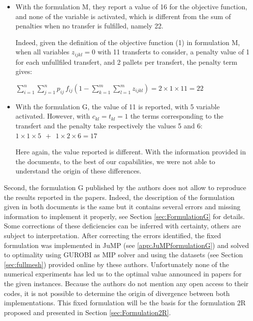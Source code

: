 \documentclass[preprint,12pt,authoryear]{elsarticle}
\begin{document}
 \begin{itemize}
     \item With  the formulation M, they report a value of 16 for the objective function, and none of the variable is activated, which is different from the sum of penalties when no transfer is fulfilled, namely 22.

Indeed, given the definition of the objective function (1) in formulation M, when  all variables $z_{ijkl}=0$  with 11 transferts to consider, a penalty value of 1 for each unfullfiled transfert, and 2 pallets per transfert, the penalty term gives:

$\sum^{n}_{i=1} \sum^{n}_{j=1} p_{ij} \, f_{ij} \left( 1-\sum^{m}_{k=1} \sum^{m}_{l=1} z_{ijkl} \right) = 2 \times 1 \times 11 = 22$

\item With  the formulation G, the value of 11 is reported, with 5 variable activated.
However, with $c_{kl} = t_{kl} = 1 $ the terms corresponding to the transfert and the penalty take respectively the values 5 and 6: \\
$1\times1\times5 \ \ + \ \ 1\times2\times6 = 17$
\vspace{0mm}

Here again, the value reported is different.
With the information provided in the documents, to the best of our capabilities, we were not able to understand the origin of these differences. 
 \end{itemize}


Second, the formulation G published by the authors does not allow to reproduce the results reported in the papers. 
%
Indeed, the description of the formulation given in both documents is the same but it contains several errors and missing information to implement it properly, see Section \ref{sec:FormulationG} for details. Some corrections of these deficiencies can be inferred with certainty, others are subject to interpretation.
%
After correcting the errors identified, the fixed formulation was implemented in JuMP (see \ref{app:JuMPformulationG}) and solved to optimality using GUROBI as MIP solver and using the datasets (see Section \ref{sec:fullmesh}) provided online by these authors.
Unfortunately none of the numerical experiments has led us to the optimal value announced in papers for the given instances.
 Because the authors do not mention any open access to their codes,  it is not possible to determine the origin of divergence between both implementations. 
This fixed formulation will be the basis for the formulation 2R proposed and presented in Section \ref{sec:Formulation2R}.   
\end{document}
